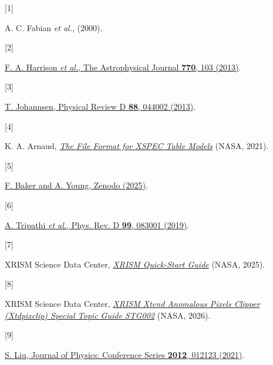 \documentclass[
  letterpaper,
  DIV=11,
  numbers=noendperiod]{scrreprt}
\newlength{\cslhangindent}
\newlength{\csllabelwidth}
\newenvironment{CSLReferences}[2] %
 {\begin{list}{}{%
  \setlength{\itemindent}{0pt}
  \setlength{\leftmargin}{0pt}
  \setlength{\parsep}{0pt}
  \ifodd #1
   \setlength{\leftmargin}{\cslhangindent}
   \setlength{\itemindent}{-1\cslhangindent}
  \fi
  \setlength{\itemsep}{#2\baselineskip}}}
 {\end{list}}
\newcommand{\CSLLeftMargin}[1]{\parbox[t]{\csllabelwidth}{\strut#1\strut}}
\newcommand{\CSLRightInline}[1]{\parbox[t]{\linewidth - \csllabelwidth}{\strut#1\strut}}
\begin{document}

\protect{}\label{refs}
\begin{CSLReferences}{0}{0}
\CSLLeftMargin{{[}1{]} }%
\CSLRightInline{A. C. Fabian \emph{et al.}, (2000).}

\CSLLeftMargin{{[}2{]} }%
\CSLRightInline{\href{https://doi.org/10.1088/0004-637X/770/2/103}{F. A.
Harrison \emph{et al.}, The Astrophysical Journal \textbf{770}, 103
(2013)}.}

\CSLLeftMargin{{[}3{]} }%
\CSLRightInline{\href{https://doi.org/10.1103/PhysRevD.88.044002}{T.
Johannsen, Physical Review D \textbf{88}, 044002 (2013)}.}

\CSLLeftMargin{{[}4{]} }%
\CSLRightInline{K. A. Arnaud,
\emph{\href{https://heasarc.gsfc.nasa.gov/docs/heasarc/caldb/docs/memos/ogip_92_009/ogip_92_009.pdf}{The
File Format for XSPEC Table Models}} (NASA, 2021).}

\CSLLeftMargin{{[}5{]} }%
\CSLRightInline{\href{https://doi.org/10.5281/zenodo.17390971}{F. Baker
and A. Young, Zenodo (2025)}.}

\CSLLeftMargin{{[}6{]} }%
\CSLRightInline{\href{https://doi.org/10.1103/PhysRevD.99.083001}{A.
Tripathi \emph{et al.}, Phys. Rev. D \textbf{99}, 083001 (2019)}.}

\CSLLeftMargin{{[}7{]} }%
\CSLRightInline{XRISM Science Data Center,
\emph{\href{https://heasarc.gsfc.nasa.gov/docs/xrism/analysis/quickstart/xrism_quick_start_guide_v3p2_251204a.pdf}{XRISM
Quick-Start Guide}} (NASA, 2025).}

\CSLLeftMargin{{[}8{]} }%
\CSLRightInline{XRISM Science Data Center,
\emph{\href{https://heasarc.gsfc.nasa.gov/docs/xrism/analysis/quickstart/xtdpixclip_guide_v1p0_260106.pdf}{XRISM
Xtend Anomalous Pixels Clipper (Xtdpixclip) Special Topic Guide STG002}}
(NASA, 2026).}

\CSLLeftMargin{{[}9{]} }%
\CSLRightInline{\href{https://doi.org/10.1088/1742-6596/2012/1/012123}{S.
Liu, Journal of Physics: Conference Series \textbf{2012}, 012123
(2021)}.}

\end{CSLReferences}
\end{document}
